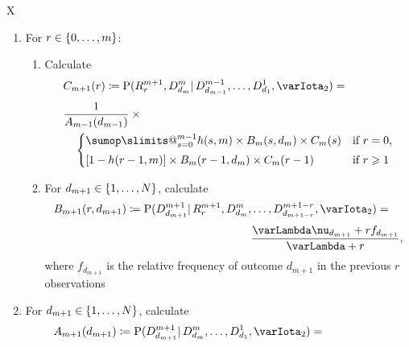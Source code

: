 \documentclass[\ifafour a4paper,12pt,\else a5paper,10pt,\fi%
onecolumn,oneside,article,%
british%
]{memoir}
\makeatletter
\theoremstyle{remark}
\theoremstyle{innote}
\def\sum{\DOTSI\sumop\slimits@}
\newcommand*{\defd}{\coloneqq}
\renewcommand{\le}{\leqslant}%
\renewcommand{\ge}{\geqslant}%
\DeclarePairedDelimiter\set{\{}{\}}
\newcommand*{\p}{\mathrm{P}}%
\renewcommand*{\|}{\mathpunct{|}}
\newcommand*{\yff}{f}
\newcommand*{\yI}{\varIota}
\newcommand*{\yMc}{\yI_2}
\newcommand*{\yN}{\varLambda}
\newcommand*{\ynn}{\nu}
\newcommand*{\yrs}{h}
\makeatother
\begin{document}
\begin{table}[!b]
  \centering
  \caption{Predictive algorithm}
  \label{tab:adamsetal_algorithm}
  \begin{tabularx}{\textwidth}{X}\hline
    \begin{enumerate}
    \item\label{item:first_step}For $r \in \set{0,\dotsc, m}$:
      \begin{enumerate}[label*=\arabic*.]
      \item Calculate
        \[ \begin{multlined}[t][0.85\textwidth]
            C_{m+1}(r) \defd
            \p(R^{m+1}_{r} , D^{m}_{d_{m}} \| D^{m-1}_{d_{m-1}}, \dotsc,
            D^{1}_{d_{1}}, \yMc) ={}\\[\jot]
       \shoveleft{\frac{1}{A_{m-1}(d_{m-1})} \times{}}\\\begin{cases}
          \sum_{s=0}^{m-1} \yrs(s,m) \times B_m(s,d_m) \times C_m(s) & \text{if $r=0$},
          \\[\jot]
          [1-\yrs(r-1,m)]  \times B_m(r-1,d_m) \times C_m(r-1)& \text{if $r\ge 1$}    
        \end{cases}
      \end{multlined}
    \]
      \item For $d_{m+1} \in \set{1,\dotsc,N}$, calculate
        \[ \begin{multlined}[][0.85\textwidth]
B_{m+1}(r,d_{m+1}) \defd \p(D^{m+1}_{d_{m+1}} \| R^{m+1}_{r}, D^{m}_{d_{m}},
          \dotsc, D^{m+1-r}_{d_{m+1-r}}, \yMc) ={}\\[\jot]
         \frac{\yN\ynn_{d_{m+1}}+r\yff_{d_{m+1}}}{\yN + r},
       \end{multlined} \]
     where $\yff_{d_{m+1}}$ is the relative frequency of outcome $d_{m+1}$ in the previous $r$ observations
  \end{enumerate}
\item For $d_{m+1} \in \set{1,\dotsc,N}$, calculate
  \[ \begin{multlined}[][0.85\textwidth]
      A_{m+1}(d_{m+1}) \defd \p(D^{m+1}_{d_{m+1}} \| D^{m}_{d_{m}}, \dotsc, D^{1}_{d_{1}}, \yMc) ={}\\[\jot]

\end{multlined}\]
\end{enumerate}
\end{tabularx}
\end{table}
\end{document}
